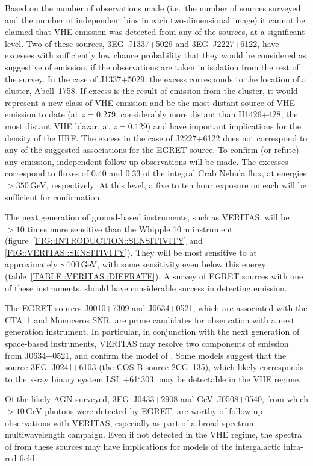 Based on the number of observations made (i.e.\ the number of sources
surveyed and the number of independent bins in each two-dimensional
image) it cannot be claimed that VHE \Gray emission was detected from
any of the sources, at a significant level. Two of these sources,
3EG~J1337$+$5029 and 3EG~J2227$+$6122, have excesses with sufficiently
low chance probability that they would be considered as suggestive of
\Gray emission, if the observations are taken in isolation from the
rest of the survey. In the case of J1337$+$5029, the excess
corresponds to the location of a cluster, Abell~1758. If excess is the
result of \Gray emission from the cluster, it would represent a new
class of VHE emission and be the most distant source of VHE emission
to date (at $z=0.279$, considerably more distant than H1426$+$428, the
most distant VHE blazar, at $z=0.129$) and have important implications
for the density of the IIRF. The excess in the case of J2227$+$6122
does not correspond to any of the suggested associations for the EGRET
source. To confirm (or refute) any emission, independent follow-up
observations will be made. The excesses correspond to fluxes of 0.40
and 0.33 of the integral Crab Nebula flux, at energies $>350$\,GeV,
respectively. At this level, a five to ten hour exposure on each will
be sufficient for confirmation.

The next generation of ground-based instruments, such as VERITAS, will
be $>10$ times more sensitive than the Whipple 10\,m instrument
(figure~\ref{FIG::INTRODUCTION::SENSITIVITY} and
\ref{FIG::VERITAS::SENSITIVITY}). They will be most sensitive to
\Grays at approximately $\sim$100\,GeV, with some sensitivity even
below this energy (table~\ref{TABLE::VERITAS::DIFFRATE}). A survey of
EGRET sources with one of these instruments, should have considerable
success in detecting \Gray emission.

The EGRET sources J0010$+$7309 and J0634$+$0521, which are associated
with the CTA~1 and Monoceros SNR, are prime candidates for observation
with a next generation instrument. In particular, in conjunction with
the next generation of space-based instruments, VERITAS may resolve
two components of emission from J0634$+$0521, and confirm the model of
\citet{REF::TORRES::PR2003}. Some models suggest that the \Gray source
3EG~J0241$+$6103 (the COS-B source 2CG~135), which likely corresponds
to the x-ray binary system LSI~$+$61$^\circ$303, may be detectable
in the VHE regime.

Of the likely AGN surveyed, 3EG~J0433$+$2908 and GeV~J0508$+$0540,
from which $>10$\,GeV photons were detected by EGRET, are worthy of
follow-up observations with VERITAS, especially as part of a broad
spectrum multiwavelength campaign. Even if not detected in the VHE
regime, the spectra of \Grays from these sources may have implications
for models of the intergalactic infra-red field.

